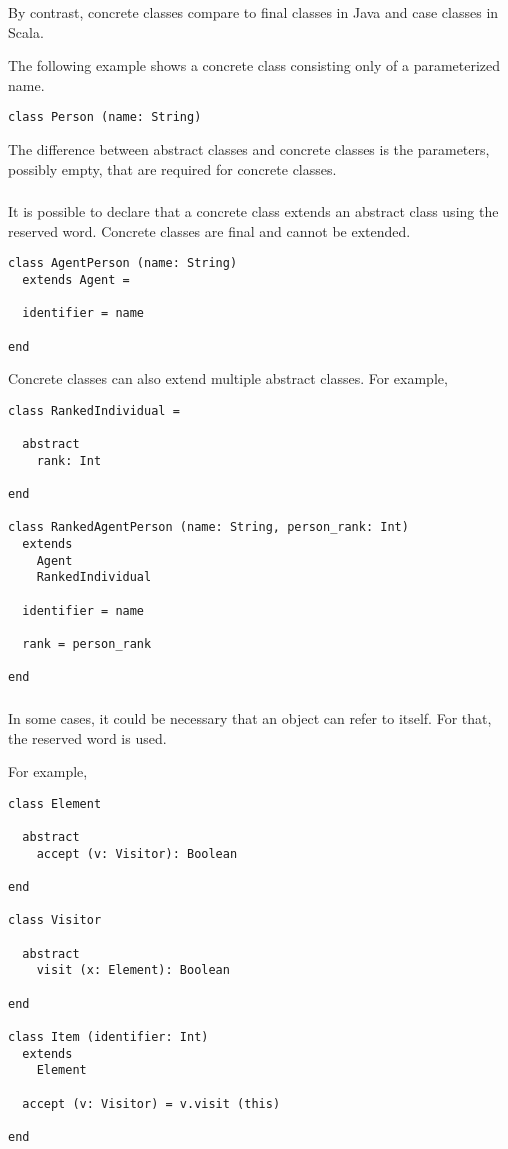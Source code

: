 By contrast, concrete classes compare to final classes in Java and case classes in Scala.

The following example shows a concrete class consisting only of a parameterized name.
\begin{lstlisting}[label={lst:exampleConcreteClass}]
class Person (name: String)
\end{lstlisting}

The difference between abstract classes and concrete classes is the parameters, possibly empty, that are required for concrete classes.

\subsubsection{\sodaextends}

It is possible to declare that a concrete class extends an abstract class using the \sodaextends reserved word.
Concrete classes are final and cannot be extended.

\begin{lstlisting}[label={lst:exampleExtends}]
class AgentPerson (name: String)
  extends Agent =

  identifier = name

end
\end{lstlisting}

Concrete classes can also extend multiple abstract classes.
For example,
\begin{lstlisting}[label={lst:exampleWith}]
class RankedIndividual =

  abstract
    rank: Int

end

class RankedAgentPerson (name: String, person_rank: Int)
  extends
    Agent
    RankedIndividual

  identifier = name

  rank = person_rank

end
\end{lstlisting}

\subsubsection{\sodathis}

In some cases, it could be necessary that an object can refer to itself.
For that, the \sodathis reserved word is used.

For example,
\begin{lstlisting}[label={lst:exampleExtendsElement}]
class Element

  abstract
    accept (v: Visitor): Boolean

end

class Visitor

  abstract
    visit (x: Element): Boolean

end

class Item (identifier: Int)
  extends
    Element

  accept (v: Visitor) = v.visit (this)

end
\end{lstlisting}

